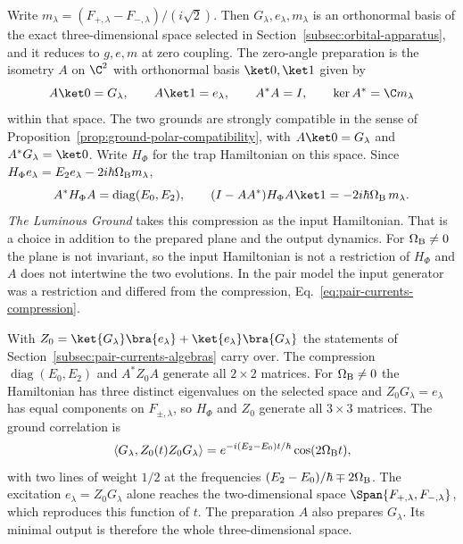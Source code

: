 Write $m_\lambda=(F_{+,\lambda}-F_{-,\lambda})/(i\sqrt2)$. Then $G_\lambda,e_\lambda,m_\lambda$ is an orthonormal basis of the exact three-dimensional space selected in Section~\ref{subsec:orbital-apparatus}, and it reduces to $g,e,m$ at zero coupling. The zero-angle preparation is the isometry $A$ on $\C^2$ with orthonormal basis $\ket0,\ket1$ given by
\begin{equation}
 A\ket0=G_\lambda,\qquad A\ket1=e_\lambda,\qquad A^*A=I,\qquad \ker A^*=\C m_\lambda
 \label{eq:pair-currents-orbital-preparation}
\end{equation}
within that space. The two grounds are strongly compatible in the sense of Proposition~\ref{prop:ground-polar-compatibility}, with $A\ket0=G_\lambda$ and $A^*G_\lambda=\ket0$. Write $H_\Phi$ for the trap Hamiltonian on this space. Since $H_\Phi e_\lambda=E_2e_\lambda-2i\hbar\Omega_{\rm B}m_\lambda$,
\begin{equation}
 A^*H_\Phi A=\operatorname{diag}(E_0,E_2),\qquad
 (I-AA^*)H_\Phi A\ket1=-2i\hbar\Omega_{\rm B}\,m_\lambda .
 \label{eq:pair-currents-orbital-compression}
\end{equation}
\emph{The Luminous Ground} \cite{LGOrbital} takes this compression as the input Hamiltonian. That is a choice in addition to the prepared plane and the output dynamics. For $\Omega_{\rm B}\ne0$ the plane is not invariant, so the input Hamiltonian is not a restriction of $H_\Phi$ and $A$ does not intertwine the two evolutions. In the pair model the input generator was a restriction and differed from the compression, Eq.~\eqref{eq:pair-currents-compression}.

With $Z_0=\ket{G_\lambda}\bra{e_\lambda}+\ket{e_\lambda}\bra{G_\lambda}$ the statements of Section~\ref{subsec:pair-currents-algebras} carry over. The compression $\operatorname{diag}(E_0,E_2)$ and $A^*Z_0A$ generate all $2\times2$ matrices. For $\Omega_{\rm B}\ne0$ the Hamiltonian has three distinct eigenvalues on the selected space and $Z_0G_\lambda=e_\lambda$ has equal components on $F_{\pm,\lambda}$, so $H_\Phi$ and $Z_0$ generate all $3\times3$ matrices. The ground correlation is
\begin{equation}
 \langle G_\lambda,Z_0(t)Z_0G_\lambda\rangle=e^{-i(E_2-E_0)t/\hbar}\cos(2\Omega_{\rm B}t),
 \label{eq:pair-currents-orbital-correlation}
\end{equation}
with two lines of weight $1/2$ at the frequencies $(E_2-E_0)/\hbar\mp2\Omega_{\rm B}$. The excitation $e_\lambda=Z_0G_\lambda$ alone reaches the two-dimensional space $\Span\{F_{+,\lambda},F_{-,\lambda}\}$, which reproduces this function of $t$. The preparation $A$ also prepares $G_\lambda$. Its minimal output is therefore the whole three-dimensional space.

